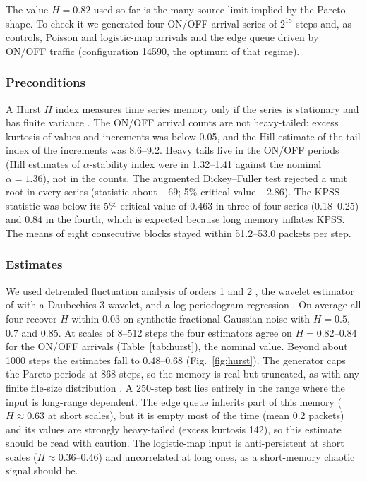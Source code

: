 \documentclass[11pt,a4paper]{article}
\begin{document}
The value $H=0.82$ used so far is the many-source limit implied by the Pareto shape. To check it we generated four ON/OFF arrival series of $2^{18}$ steps and, as controls, Poisson and logistic-map arrivals and the edge queue driven by ON/OFF traffic (configuration 14590, the optimum of that regime).

\subsubsection{Preconditions}
A Hurst $H$ index measures time series memory only if the series is stationary and has finite variance \citep{pipiras2017longrange}. The ON/OFF arrival counts are not heavy-tailed: excess kurtosis of values and increments was below 0.05, and the Hill estimate \citep{hill1975simple} of the tail index of the increments was 8.6--9.2. Heavy tails live in the ON/OFF periods (Hill estimates of $\alpha$-stability index were in 1.32--1.41 against the nominal $\alpha=1.36$), not in the counts. The augmented Dickey--Fuller test \citep{dickey1979distribution} rejected a unit root in every series (statistic about $-69$; 5\% critical value $-2.86$). The KPSS statistic \citep{kwiatkowski1992testing} was below its 5\% critical value of 0.463 in three of four series (0.18--0.25) and 0.84 in the fourth, which is expected because long memory inflates KPSS. The means of eight consecutive blocks stayed within 51.2--53.0 packets per step.

\subsubsection{Estimates}
We used detrended fluctuation analysis of orders 1 and 2 \citep{peng1994mosaic,kantelhardt2001detecting}, the wavelet estimator of \citet{abry1998wavelet} with a Daubechies-3 wavelet, and a log-periodogram regression \citep{geweke1983estimation}. On average all four recover $H$ within 0.03 on synthetic fractional Gaussian noise with $H=0.5$, 0.7 and 0.85. At scales of 8--512 steps the four estimators agree on $H=0.82$--$0.84$ for the ON/OFF arrivals (Table~\ref{tab:hurst}), the nominal value. Beyond about 1000 steps the estimates fall to 0.48--0.68 (Fig.~\ref{fig:hurst}). The generator caps the Pareto periods at 868 steps, so the memory is real but truncated, as with any finite file-size distribution \citep{crovella1997selfsimilarity}. A 250-step test lies entirely in the range where the input is long-range dependent. The edge queue inherits part of this memory ($H\approx0.63$ at short scales), but it is empty most of the time (mean 0.2 packets) and its values are strongly heavy-tailed (excess kurtosis 142), so this estimate should be read with caution. The logistic-map input is anti-persistent at short scales ($H\approx0.36$--$0.46$) and uncorrelated at long ones, as a short-memory chaotic signal should be.
\end{document}
